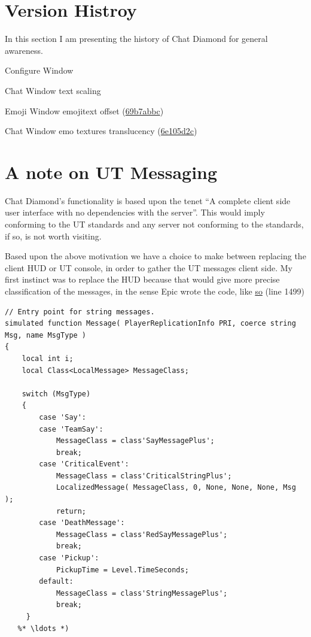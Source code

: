 \documentclass{article}
\theoremstyle{definition}
\begin{document}
\section{Version Histroy}
In this section I am presenting the history of Chat Diamond for general awareness.
\begin{changelog}[author=The\_Cowboy, sectioncmd=\section*]
\begin{version}[v=0.5, date=2023-xx-xx]
  \added
    \item Configure Window
  \fixed
    \item Chat Window text scaling
    \item Emoji Window emojitext offset (\href{https://github.com/ravimohan1991/ChatDiamond/commit/69b7abbce0617ae1c2de0660379984852df9c76d}{69b7abbc})
    \item Chat Window emo textures translucency (\href{https://github.com/ravimohan1991/ChatDiamond/commit/6e105d2cce5db1380c27df546e604d0f306eccd4}{6e105d2c})
\end{version}
\end{changelog}

\section{A note on UT Messaging}
Chat Diamond's functionality is based upon the tenet ``A complete client side user interface with no dependencies with the server''.  This would imply conforming to the UT standards and any server not conforming to the standards, if so, is not worth visiting.

Based upon the above motivation we have a choice to make between replacing the client HUD or UT console, in order to gather the UT messages client side.  My first instinct was to replace the HUD because that would give more precise classification of the messages, in the sense Epic wrote the code, like \href{http://uncodex.ut-files.com/UT/v436/Source_botpack/challengehud.html}{so} (line 1499)

\begin{lstlisting}[frame=single]
// Entry point for string messages.
simulated function Message( PlayerReplicationInfo PRI, coerce string Msg, name MsgType )
{
    local int i;
    local Class<LocalMessage> MessageClass;

    switch (MsgType)
    {
        case 'Say':
        case 'TeamSay':
            MessageClass = class'SayMessagePlus';
            break;
        case 'CriticalEvent':
            MessageClass = class'CriticalStringPlus';
            LocalizedMessage( MessageClass, 0, None, None, None, Msg );
            return;
        case 'DeathMessage':
            MessageClass = class'RedSayMessagePlus';
            break;
        case 'Pickup':
            PickupTime = Level.TimeSeconds;
        default:
            MessageClass = class'StringMessagePlus';
            break;
     }
   %* \ldots *)           
\end{lstlisting}
\end{document}
